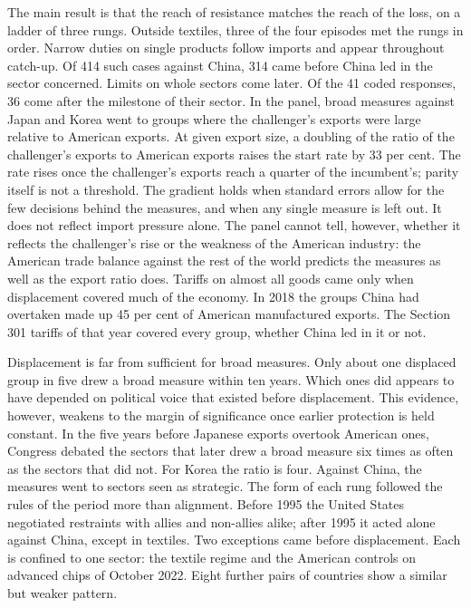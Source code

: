 \documentclass[review,authoryear,12pt]{elsarticle}
\begin{document}
The main result is that the reach of resistance matches the reach of the loss, on a ladder of three rungs. Outside textiles, three of the four episodes met the rungs in order. Narrow duties on single products follow imports and appear throughout catch-up. Of 414 such cases against China, 314 came before China led in the sector concerned. Limits on whole sectors come later. Of the 41 coded responses, 36 come after the milestone of their sector. In the panel, broad measures against Japan and Korea went to groups where the challenger's exports were large relative to American exports. At given export size, a doubling of the ratio of the challenger's exports to American exports raises the start rate by 33 per cent. The rate rises once the challenger's exports reach a quarter of the incumbent's; parity itself is not a threshold. The gradient holds when standard errors allow for the few decisions behind the measures, and when any single measure is left out. It does not reflect import pressure alone. The panel cannot tell, however, whether it reflects the challenger's rise or the weakness of the American industry: the American trade balance against the rest of the world predicts the measures as well as the export ratio does. Tariffs on almost all goods came only when displacement covered much of the economy. In 2018 the groups China had overtaken made up 45 per cent of American manufactured exports. The Section 301 tariffs of that year covered every group, whether China led in it or not.

Displacement is far from sufficient for broad measures. Only about one displaced group in five drew a broad measure within ten years. Which ones did appears to have depended on political voice that existed before displacement. This evidence, however, weakens to the margin of significance once earlier protection is held constant. In the five years before Japanese exports overtook American ones, Congress debated the sectors that later drew a broad measure six times as often as the sectors that did not. For Korea the ratio is four. Against China, the measures went to sectors seen as strategic. The form of each rung followed the rules of the period more than alignment. Before 1995 the United States negotiated restraints with allies and non-allies alike; after 1995 it acted alone against China, except in textiles. Two exceptions came before displacement. Each is confined to one sector: the textile regime and the American controls on advanced chips of October 2022. Eight further pairs of countries show a similar but weaker pattern.
\end{document}
